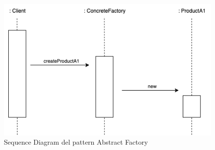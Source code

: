 \begin{figure}[H]
    \centering
    \includegraphics[width=1\linewidth]{assets/pattern/abstract-factory/abstract-factory-sequence.drawio.png}
    \caption{Sequence Diagram del pattern Abstract Factory}
\end{figure}

\newpage
